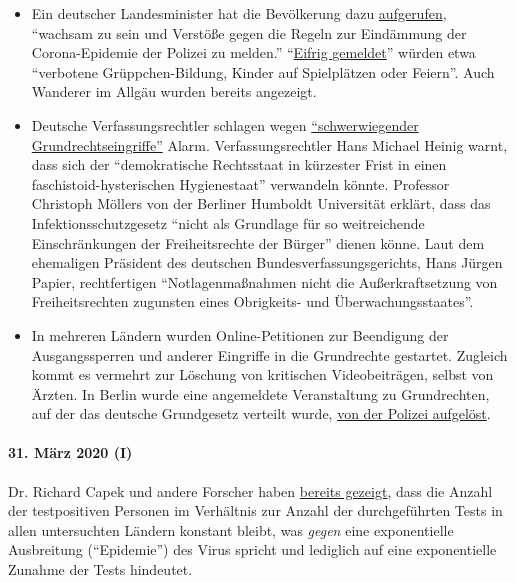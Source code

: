 \begin{itemize}
\tightlist
\item
  Ein deutscher Landesminister hat die Bevölkerung dazu
  \href{https://de.nachrichten.yahoo.com/strobl-bürger-verstöße-gegen-corona-regeln-polizei-melden-095746341.html}{aufgerufen},
  ``wachsam zu sein und Verstöße gegen die Regeln zur Eindämmung der
  Corona-Epidemie der Polizei zu melden.''
  ``\href{https://www.br.de/nachrichten/bayern/buerger-melden-eifrig-verstoesse-gegen-corona-regeln,RuGXp1h}{Eifrig
  gemeldet}'' würden etwa ``verbotene Grüppchen-Bildung, Kinder auf
  Spielplätzen oder Feiern''. Auch Wanderer im Allgäu wurden bereits
  angezeigt.
\item
  Deutsche Verfassungsrechtler schlagen wegen
  \href{https://www.focus.de/politik/deutschland/corona-regelungen-der-regierung-medizin-darf-nicht-gefaehrlicher-sein-als-die-krankheit_id_11827625.html}{``schwerwiegender
  Grundrechtseingriffe''} Alarm. Verfassungsrechtler Hans Michael Heinig
  warnt, dass sich der ``demokratische Rechtsstaat in kürzester Frist in
  einen faschistoid-hysterischen Hygienestaat'' verwandeln könnte.
  Professor Christoph Möllers von der Berliner Humboldt Universität
  erklärt, dass das Infektionsschutzgesetz ``nicht als Grundlage für so
  weitreichende Einschränkungen der Freiheitsrechte der Bürger'' dienen
  könne. Laut dem ehemaligen Präsident des deutschen
  Bundesverfassungsgerichts, Hans Jürgen Papier, rechtfertigen
  ``Notlagen­maßnahmen nicht die Außerkraftsetzung von Freiheitsrechten
  zugunsten eines Obrigkeits- und Überwachungsstaates''.
\item
  In mehreren Ländern wurden Online-Petitionen zur Beendigung der
  Ausgangssperren und anderer Eingriffe in die Grundrechte gestartet.
  Zugleich kommt es vermehrt zur Löschung von kritischen Videobeiträgen,
  selbst von Ärzten. In Berlin wurde eine angemeldete Veranstaltung zu
  Grundrechten, auf der das deutsche Grundgesetz verteilt wurde,
  \href{https://www.heise.de/tp/features/Wenn-Demonstranten-zu-Gefaehrdern-erklaert-werden-4692869.html}{von
  der Polizei aufgelöst}.
\end{itemize}

\hypertarget{31-muxe4rz-2020-i}{%
\paragraph{31. März 2020 (I)}\label{31-muxe4rz-2020-i}}

Dr. Richard Capek und andere Forscher haben
\href{https://coronadaten.wordpress.com/}{bereits gezeigt}, dass die
Anzahl der testpositiven Personen im Verhältnis zur Anzahl der
durchgeführten Tests in allen untersuchten Ländern konstant bleibt, was
\emph{gegen} eine exponentielle Ausbreitung (``Epidemie'') des Virus
spricht und lediglich auf eine exponentielle Zunahme der Tests
hindeutet.

